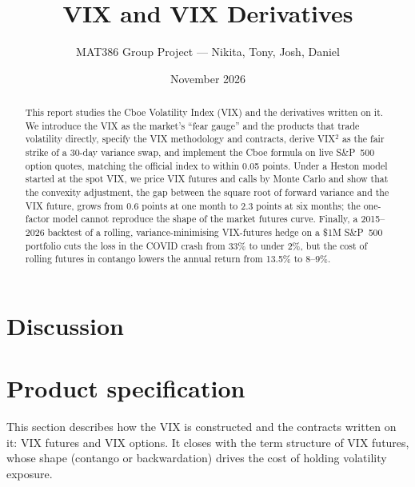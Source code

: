 \documentclass[11pt,a4paper]{article}
\title{VIX and VIX Derivatives}
\author{MAT386 Group Project --- Nikita, Tony, Josh, Daniel}
\date{November 2026}
\begin{document}
\maketitle

\begin{abstract}
\noindent
This report studies the Cboe Volatility Index (VIX) and the derivatives written on it. We introduce the VIX as the market's ``fear gauge'' and the products that trade volatility directly, specify the VIX methodology and contracts, derive VIX$^2$ as the fair strike of a 30-day variance swap, and implement the Cboe formula on live S\&P~500 option quotes, matching the official index to within 0.05 points. Under a Heston model started at the spot VIX, we price VIX futures and calls by Monte Carlo and show that the convexity adjustment, the gap between the square root of forward variance and the VIX future, grows from 0.6 points at one month to 2.3 points at six months; the one-factor model cannot reproduce the shape of the market futures curve. Finally, a 2015--2026 backtest of a rolling, variance-minimising VIX-futures hedge on a \$1M S\&P~500 portfolio cuts the loss in the COVID crash from 33\% to under 2\%, but the cost of rolling futures in contango lowers the annual return from 13.5\% to 8--9\%.
\end{abstract}

\tableofcontents
\newpage

\section{Discussion}


\section{Product specification}
\label{sec:product-spec}

This section describes how the VIX is constructed and the contracts written on it: VIX futures and VIX options. It closes with the term structure of VIX futures, whose shape (contango or backwardation) drives the cost of holding volatility exposure.


\end{document}
